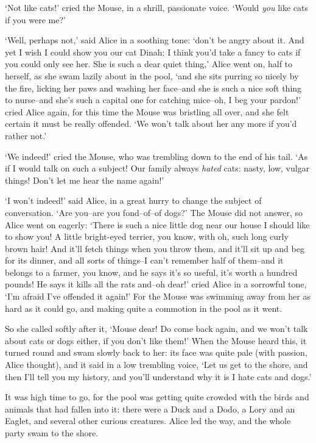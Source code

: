   `Not like cats!' cried the Mouse, in a shrill, passionate
voice.  `Would {\it you} like cats if you were me?'

  `Well, perhaps not,' said Alice in a soothing tone:  `don't be
angry about it.  And yet I wish I could show you our cat Dinah:
I think you'd take a fancy to cats if you could only see her.
She is such a dear quiet thing,' Alice went on, half to herself,
as she swam lazily about in the pool, `and she sits purring so
nicely by the fire, licking her paws and washing her face--and
she is such a nice soft thing to nurse--and she's such a capital
one for catching mice--oh, I beg your pardon!' cried Alice again,
for this time the Mouse was bristling all over, and she felt
certain it must be really offended.  `We won't talk about her any
more if you'd rather not.'

  `We indeed!' cried the Mouse, who was trembling down to the end
of his tail.  `As if I would talk on such a subject!  Our family
always {\it hated} cats:  nasty, low, vulgar things!  Don't let me hear
the name again!'

  `I won't indeed!' said Alice, in a great hurry to change the
subject of conversation.  `Are you--are you fond--of--of dogs?'
The Mouse did not answer, so Alice went on eagerly:  `There is
such a nice little dog near our house I should like to show you!
A little bright-eyed terrier, you know, with oh, such long curly
brown hair!  And it'll fetch things when you throw them, and
it'll sit up and beg for its dinner, and all sorts of things--I
can't remember half of them--and it belongs to a farmer, you
know, and he says it's so useful, it's worth a hundred pounds!
He says it kills all the rats and--oh dear!' cried Alice in a
sorrowful tone, `I'm afraid I've offended it again!'  For the
Mouse was swimming away from her as hard as it could go, and
making quite a commotion in the pool as it went.

  So she called softly after it, `Mouse dear!  Do come back
again, and we won't talk about cats or dogs either, if you don't
like them!'  When the Mouse heard this, it turned round and swam
slowly back to her:  its face was quite pale (with passion, Alice
thought), and it said in a low trembling voice, `Let us get to
the shore, and then I'll tell you my history, and you'll
understand why it is I hate cats and dogs.'

  It was high time to go, for the pool was getting quite crowded
with the birds and animals that had fallen into it:  there were a
Duck and a Dodo, a Lory and an Eaglet, and several other curious
creatures.  Alice led the way, and the whole party swam to the
shore.



